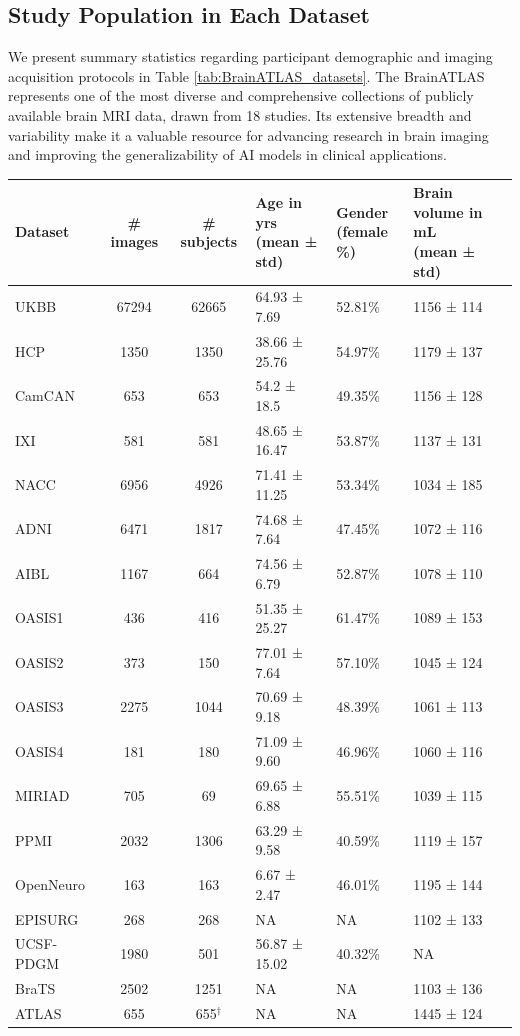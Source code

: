 \documentclass[pdflatex,sn-nature]{sn-jnl}%
\newif\ifhighlight
\newcommand{\rev}[1]{\ifhighlight{\color{blue}{}#1}\else#1\fi}%
\newcommand{\revdel}[1]{\ifhighlight{\color{red}\sout{#1}}\fi}
\theoremstyle{thmstyleone}%
\theoremstyle{thmstyletwo}%
\theoremstyle{thmstylethree}%
\begin{document}
\begin{appendices}
\clearpage
\subsection{Study Population in Each Dataset}

We present summary statistics regarding participant demographic and imaging acquisition protocols in Table \ref{tab:BrainATLAS_datasets}. The BrainATLAS represents one of the most diverse and comprehensive collections of publicly available brain MRI data, drawn from 18 studies. Its extensive breadth and variability make it a valuable resource for advancing research in brain imaging and improving the generalizability of AI models in clinical applications.

\begin{table}[h!]
\centering
\begin{tabular}{l|c|c|l|l|l}
\hline
\textbf{Dataset} & \# images & \# subjects & \makecell{Age in yrs\\ (mean ± std)}  & \makecell{Gender\\ (female \%)} & \makecell{Brain volume in mL\\ (mean ± std)} \\ \hline
UKBB & 67294 & 62665 & 64.93 ± 7.69 & 52.81\% & 1156 ± 114 \\ 
HCP & 1350 & 1350 & 38.66 ± 25.76 & 54.97\% & 1179 ± 137 \\ 
CamCAN & 653 & 653 & 54.2 ± 18.5  & 49.35\% & 1156 ± 128 \\ 
IXI & 581 & 581 & 48.65 ± 16.47 & 53.87\% & 1137 ± 131 \\ \hline
NACC & 6956 & 4926 & 71.41 ± 11.25 & 53.34\% & 1034 ± 185 \\ 
ADNI & 6471 & 1817 & 74.68 ± 7.64 & 47.45\% & 1072 ± 116 \\ 
AIBL & 1167 & 664 & 74.56 ± 6.79 & 52.87\% & 1078 ± 110 \\ 
OASIS1 & 436 & 416 & 51.35 ± 25.27 & 61.47\% & 1089 ± 153 \\ 
OASIS2 & 373 & 150 & 77.01 ± 7.64 & 57.10\% & 1045 ± 124 \\ 
OASIS3 & 2275 & 1044 & 70.69 ± 9.18 & 48.39\% & 1061 ± 113 \\ 
OASIS4 & 181 & 180 & 71.09 ± 9.60 & 46.96\% & 1060 ± 116 \\ 
MIRIAD & 705 & 69 & 69.65 ± 6.88 & 55.51\% & 1039 ± 115 \\ 
PPMI & 2032 & 1306 & 63.29 ± 9.58 & 40.59\% & 1119 ± 157 \\ 
OpenNeuro & 163 & 163 & 6.67 ± 2.47 & 46.01\% & 1195 ± 144 \\ 
EPISURG & 268 & 268 & NA & NA & 1102 ± 133 \\ 
UCSF-PDGM & 1980 & 501 & 56.87 ± 15.02 & 40.32\% & NA \\ 
BraTS & 2502 & 1251 & NA & NA & 1103 ± 136 \\ 
ATLAS & 655 & \revdel{33}\rev{655$^{\dagger}$} & NA & NA & 1445 ± 124 \\ \hline
\end{tabular}


\end{table}
\end{appendices}
\end{document}
